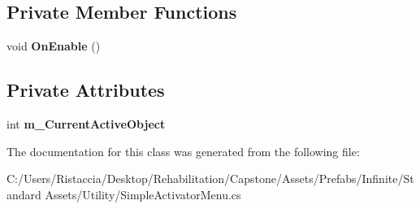 \subsection*{Private Member Functions}
\begin{DoxyCompactItemize}
\item 
\mbox{\label{class_unity_standard_assets_1_1_utility_1_1_simple_activator_menu_a10f69971ee343535f73238b2de5fdde3}} 
void {\bfseries On\+Enable} ()
\end{DoxyCompactItemize}
\subsection*{Private Attributes}
\begin{DoxyCompactItemize}
\item 
\mbox{\label{class_unity_standard_assets_1_1_utility_1_1_simple_activator_menu_ab0cc148ed721250ef4286240459f0709}} 
int {\bfseries m\+\_\+\+Current\+Active\+Object}
\end{DoxyCompactItemize}


The documentation for this class was generated from the following file\+:\begin{DoxyCompactItemize}
\item 
C\+:/\+Users/\+Ristaccia/\+Desktop/\+Rehabilitation/\+Capstone/\+Assets/\+Prefabs/\+Infinite/\+Standard Assets/\+Utility/Simple\+Activator\+Menu.\+cs\end{DoxyCompactItemize}
